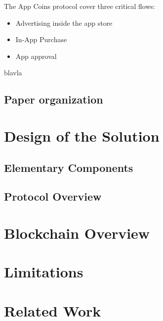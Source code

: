 \documentclass[12pt, a4paper, twoside, titlepage]{article}
\begin{document}
The App Coins protocol cover three critical flows:

\begin{itemize}
\item Advertising inside the app store
\item In-App Purchase 
\item App approval
\end{itemize}

blavla


\subsection{Paper organization}

\section{Design of the Solution}

\subsection{Elementary Components}


\subsection{Protocol Overview}


\section{Blockchain Overview}



\section{Limitations}


\section{Related Work}
\end{document}
